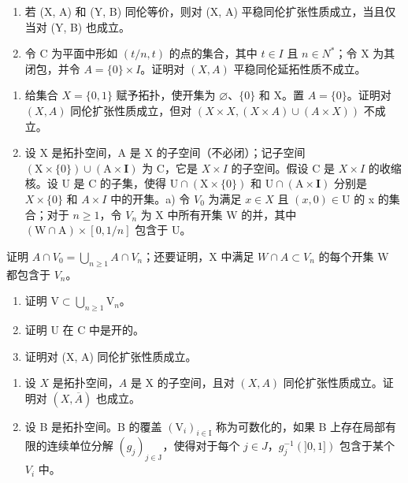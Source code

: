 \begin{enumerate}
\def\labelenumi{\alph{enumi})}
\setcounter{enumi}{1}
\item
  若 (X, A) 和 (Y, B) 同伦等价，则对 (X, A) 平稳同伦扩张性质成立，当且仅当对 (Y, B) 也成立。
\item
  令 C 为平面中形如 \((t/n,t)\) 的点的集合，其中 \(t \in I\) 且 \(n \in N^{*}\)；令 X 为其闭包，并令 \(A = \{0\} \times I\)。证明对 \((X,A)\) 平稳同伦延拓性质不成立。
\end{enumerate}

\begin{enumerate}
\def\labelenumi{\arabic{enumi})}
\setcounter{enumi}{25}
\item
  给集合 \(X = \{0,1\}\) 赋予拓扑，使开集为 \(\varnothing\)、\(\{0\}\) 和 X。置 \(A = \{0\}\)。证明对 \((X,A)\) 同伦扩张性质成立，但对 \((X \times X,(X \times A) \cup (A \times X))\) 不成立。
\item
  设 X 是拓扑空间，A 是 X 的子空间（不必闭）；记子空间 \((\mathrm{X} \times \{0\}) \cup (\mathrm{A} \times \mathbf{I})\) 为 C，它是 \(X \times I\) 的子空间。假设 C 是 \(X \times I\) 的收缩核。设 U 是 C 的子集，使得 \(\mathrm{U} \cap (\mathrm{X} \times \{0\})\) 和 \(\mathrm{U} \cap (\mathrm{A} \times \mathbf{I})\) 分别是 \(X \times \{0\}\) 和 \(A \times I\) 中的开集。a) 令 \(V_{0}\) 为满足 \(x \in X\) 且 \((x, 0) \in \mathrm{U}\) 的 x 的集合；对于 \(n \geqslant 1\)，令 \(V_{n}\) 为 X 中所有开集 W 的并，其中 \((\mathrm{W} \cap \mathrm{A}) \times [0, 1/n]\) 包含于 U。
\end{enumerate}

证明 \(A \cap V_{0} = \bigcup_{n \geqslant 1} A \cap V_{n}\)；还要证明，X 中满足 \(W \cap A \subset V_{n}\) 的每个开集 W 都包含于 \(V_{n}\)。

\begin{enumerate}
\def\labelenumi{\alph{enumi})}
\setcounter{enumi}{1}
\item
  证明 \(\mathrm{V} \subset \bigcup_{n \geqslant 1} \mathrm{V}_n\)。
\item
  证明 U 在 C 中是开的。
\item
  证明对 (X, A) 同伦扩张性质成立。
\end{enumerate}

\begin{enumerate}
\def\labelenumi{\arabic{enumi})}
\setcounter{enumi}{27}
\item
  设 \(X\) 是拓扑空间，\(A\) 是 X 的子空间，且对 \((X, A)\) 同伦扩张性质成立。证明对 \((X, \overline{A})\) 也成立。
\item
  设 B 是拓扑空间。B 的覆盖 \((\mathrm{V}_{i})_{i\in\mathrm{I}}\) 称为可数化的，如果 B 上存在局部有限的连续单位分解 \((g_{j})_{j\in\mathrm{J}}\)，使得对于每个 \(j\in J\)，\(g_{j}^{-1}(]0,1])\) 包含于某个 \(V_{i}\) 中。
\end{enumerate}

